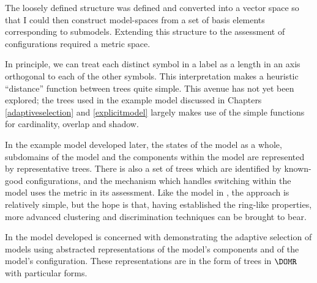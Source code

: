 The loosely defined structure was defined and converted into a vector
space so that I could then construct model-spaces from a set of basis
elements corresponding to submodels. Extending this structure to the
assessment of configurations required a metric space.

In principle, we can treat each distinct symbol in a label as a 
length in an axis orthogonal to each of the other symbols.  This
interpretation makes a heuristic ``distance'' function between trees
quite simple.  This avenue has not yet been explored; the trees used
in the example model discussed in Chapters \ref{adaptiveselection}
and \ref{explicitmodel} largely makes use of the simple functions for
cardinality, overlap and shadow.




In the example model developed later, the states of the model as a
whole, subdomains of the model and the components within the model are
represented by representative trees.  There is also a set of trees
which are identified by known-good configurations, and the
mechanism which handles switching within the model uses the metric in
its assessment.  Like the model in \Ctwo, the
approach is relatively simple, but the hope is that, having established
the ring-like properties, more advanced clustering and
discrimination techniques can be brought to bear.

In \Cthree the model developed is concerned with
demonstrating the adaptive selection of models using abstracted
representations of the model's components and of the model's
configuration. These representations are in the form of trees in
$\DOMR$ with particular forms.





